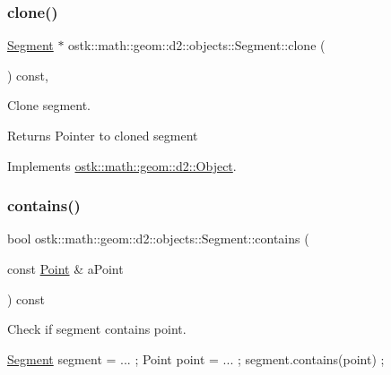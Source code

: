 \subsubsection{\texorpdfstring{clone()}{clone()}}
{\footnotesize\ttfamily \hyperlink{classostk_1_1math_1_1geom_1_1d2_1_1objects_1_1_segment}{Segment} $\ast$ ostk\+::math\+::geom\+::d2\+::objects\+::\+Segment\+::clone (\begin{DoxyParamCaption}{ }\end{DoxyParamCaption}) const\hspace{0.3cm}{\ttfamily [override]}, {\ttfamily [virtual]}}



Clone segment. 

\begin{DoxyReturn}{Returns}
Pointer to cloned segment 
\end{DoxyReturn}


Implements \hyperlink{classostk_1_1math_1_1geom_1_1d2_1_1_object_a98dedc6792aef35308966ca768eb3e14}{ostk\+::math\+::geom\+::d2\+::\+Object}.

\mbox{\label{classostk_1_1math_1_1geom_1_1d2_1_1objects_1_1_segment_a08468b912471a18d29062b96968afc2f}} 
\subsubsection{\texorpdfstring{contains()}{contains()}\hspace{0.1cm}{\footnotesize\ttfamily [1/2]}}
{\footnotesize\ttfamily bool ostk\+::math\+::geom\+::d2\+::objects\+::\+Segment\+::contains (\begin{DoxyParamCaption}\item[{const \hyperlink{classostk_1_1math_1_1geom_1_1d2_1_1objects_1_1_point}{Point} \&}]{a\+Point }\end{DoxyParamCaption}) const}



Check if segment contains point. 


\begin{DoxyCode}
\hyperlink{classostk_1_1math_1_1geom_1_1d2_1_1objects_1_1_segment_a56c91f22315d7cefe9d5e9973330028d}{Segment} segment = ... ;
Point point = ... ;
segment.contains(point) ;
\end{DoxyCode}



